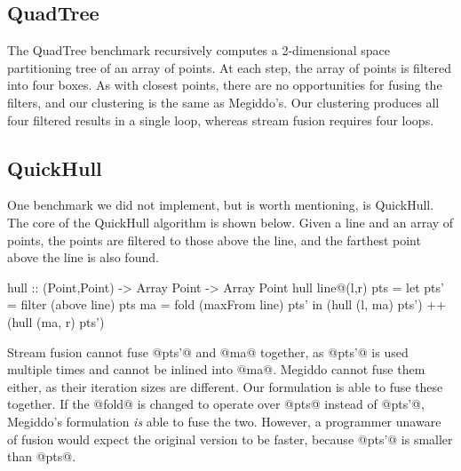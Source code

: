 \subsection{QuadTree}
The QuadTree benchmark recursively computes a 2-dimensional space partitioning tree of an array of points.
At each step, the array of points is filtered into four boxes.
As with closest points, there are no opportunities for fusing the filters, and our clustering is the same as Megiddo's.
Our clustering produces all four filtered results in a single loop, whereas stream fusion requires four loops.


\subsection{QuickHull}
One benchmark we did not implement, but is worth mentioning, is QuickHull.
The core of the QuickHull algorithm is shown below.
Given a line and an array of points, the points are filtered to those above the line,
and the farthest point above the line is also found.

\begin{code}

hull :: (Point,Point) -> Array Point -> Array Point
hull line@(l,r) pts
 = let pts' = filter (above   line) pts
       ma   = fold   (maxFrom line) pts'
   in (hull (l, ma) pts') ++ (hull (ma, r) pts')
\end{code}

Stream fusion cannot fuse @pts'@ and @ma@ together, as @pts'@ is used multiple times and cannot be inlined into @ma@.
Megiddo cannot fuse them either, as their iteration sizes are different.
Our formulation is able to fuse these together.
If the @fold@ is changed to operate over @pts@ instead of @pts'@, Megiddo's formulation \emph{is} able to fuse the two.
However, a programmer unaware of fusion would expect the original version to be faster, because @pts'@ is smaller than @pts@.

